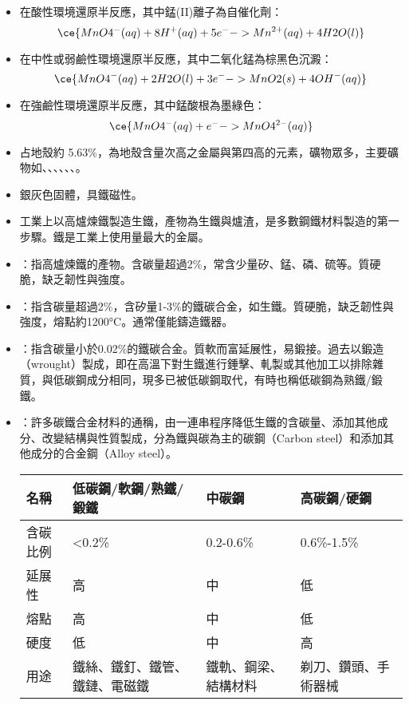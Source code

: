 \documentclass[a4paper,12pt]{report}
\begin{document}
\begin{itemize}
\begin{itemize}
\item 在酸性環境還原半反應，其中錳(II)離子為自催化劑：
\[\ce{MnO4^-(aq) + 8H^+(aq) + 5e^- -> Mn^{2+}(aq) + 4H2O(l)}\]
\item 在中性或弱鹼性環境還原半反應，其中二氧化錳為棕黑色沉澱：
\[\ce{MnO4^-(aq) + 2H2O(l) + 3e^- -> MnO2(s) + 4OH^-(aq)}\]
\item 在強鹼性環境還原半反應，其中錳酸根為墨綠色：
\[\ce{MnO4^-(aq) + e^- -> MnO4^{2-}(aq)}\]
\eit
{}
\bit
\item 占地殼約 5.63\%，為地殼含量次高之金屬與第四高的元素，礦物眾多，主要礦物如、、、、、、。
\item 銀灰色固體，具鐵磁性。
\item 工業上以高爐煉鐵製造生鐵，產物為生鐵與爐渣，是多數鋼鐵材料製造的第一步驟。鐵是工業上使用量最大的金屬。
\item {}：指高爐煉鐵的產物。含碳量超過2\%，常含少量矽、錳、磷、硫等。質硬脆，缺乏韌性與強度。
\item {}：指含碳量超過2\%，含矽量1-3\%的鐵碳合金，如生鐵。質硬脆，缺乏韌性與強度，熔點約1200°C。通常僅能鑄造鐵器。
\item {}：指含碳量小於0.02\%的鐵碳合金。質軟而富延展性，易鍛接。過去以鍛造（wrought）製成，即在高溫下對生鐵進行錘擊、軋製或其他加工以排除雜質，與低碳鋼成分相同，現多已被低碳鋼取代，有時也稱低碳鋼為熟鐵/鍛鐵。
\item {}：許多碳鐵合金材料的通稱，由一連串程序降低生鐵的含碳量、添加其他成分、改變結構與性質製成，分為鐵與碳為主的碳鋼（Carbon steel）和添加其他成分的合金鋼（Alloy steel）。
\eit
{}
\begin{longtable}[c]{|p{0.2\tw}|p{0.2\tw}|p{0.2\tw}|p{0.2\tw}|}
\hline
名稱 & 低碳鋼/軟鋼/熟鐵/鍛鐵 & 中碳鋼 & 高碳鋼/硬鋼 \\\hline
含碳比例 & <0.2\% & 0.2-0.6\% & 0.6\%-1.5\% \\\hline
延展性 & 高 & 中 & 低 \\\hline
熔點 & 高 & 中 & 低 \\\hline
硬度 & 低 & 中 & 高 \\\hline
用途 & 鐵絲、鐵釘、鐵管、鐵鏈、電磁鐵 & 鐵軌、鋼梁、結構材料 & 剃刀、鑽頭、手術器械 \\\hline

\end{longtable}
\end{itemize}
\end{itemize}
\end{document}
